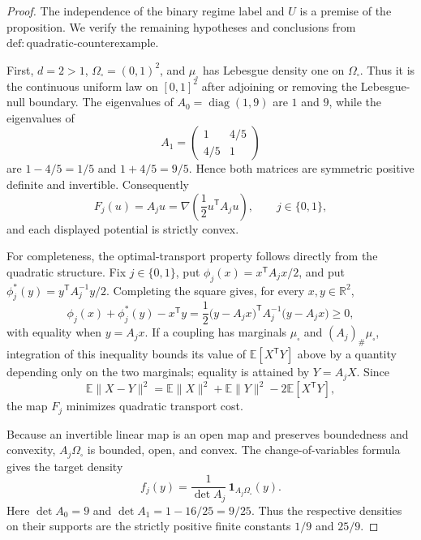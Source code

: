 \documentclass{article}
\begin{document}
\begin{proof}
The independence of the binary regime label and \(U\) is a premise of the proposition.  We verify the remaining hypotheses and conclusions from \(\mathrm{def:quadratic\text{-}counterexample}\).

First, \(d=2>1\), \(\Omega_{\square}=(0,1)^2\), and \(\mu_{\square}\) has Lebesgue density one on \(\Omega_{\square}\).  Thus it is the continuous uniform law on \([0,1]^2\) after adjoining or removing the Lebesgue-null boundary.  The eigenvalues of \(A_0=\operatorname{diag}(1,9)\) are \(1\) and \(9\), while the eigenvalues of
\[
A_1=\begin{pmatrix}1&4/5\\4/5&1\end{pmatrix}
\]
are \(1-4/5=1/5\) and \(1+4/5=9/5\).  Hence both matrices are symmetric positive definite and invertible.  Consequently
\[
F_j(u)=A_j u=\nabla\!\left(\frac12u^{\mathsf T}A_j u\right),
\qquad j\in\{0,1\},
\]
and each displayed potential is strictly convex.

For completeness, the optimal-transport property follows directly from the quadratic structure.  Fix \(j\in\{0,1\}\), put \(\phi_j(x)=x^{\mathsf T}A_jx/2\), and put \(\phi_j^*(y)=y^{\mathsf T}A_j^{-1}y/2\).  Completing the square gives, for every \(x,y\in\mathbb R^2\),
\[
\phi_j(x)+\phi_j^*(y)-x^{\mathsf T}y
=\frac12\bigl(y-A_jx\bigr)^{\mathsf T}A_j^{-1}
       \bigl(y-A_jx\bigr)\ge 0,
\]
with equality when \(y=A_jx\).  If a coupling has marginals \(\mu_{\square}\) and \((A_j)_{\#}\mu_{\square}\), integration of this inequality bounds its value of \(\mathbb E[X^{\mathsf T}Y]\) above by a quantity depending only on the two marginals; equality is attained by \(Y=A_jX\).  Since
\[
\mathbb E\lVert X-Y\rVert^2
=\mathbb E\lVert X\rVert^2+\mathbb E\lVert Y\rVert^2
 -2\mathbb E[X^{\mathsf T}Y],
\]
the map \(F_j\) minimizes quadratic transport cost.

Because an invertible linear map is an open map and preserves boundedness and convexity, \(A_j\Omega_{\square}\) is bounded, open, and convex.  The change-of-variables formula gives the target density
\[
f_j(y)=\frac{1}{\det A_j}\,
\mathbf 1_{A_j\Omega_{\square}}(y).
\]
Here \(\det A_0=9\) and \(\det A_1=1-16/25=9/25\).  Thus the respective densities on their supports are the strictly positive finite constants \(1/9\) and \(25/9\).


\end{proof}
\end{document}
